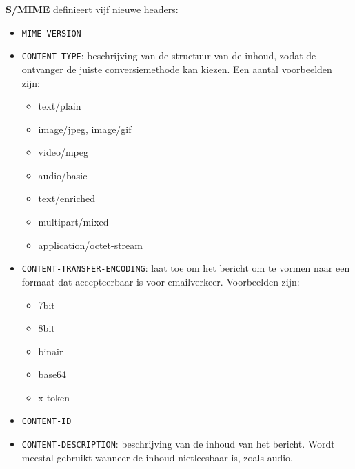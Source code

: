 \documentclass{report}
\begin{document}
	\textbf{S/MIME} definieert \underline{vijf nieuwe headers}:
	\begin{itemize}
		\item[\info] \texttt{MIME-VERSION}
		\item[\info] \texttt{CONTENT-TYPE}: beschrijving van de structuur van de inhoud, zodat de ontvanger de juiste conversiemethode kan kiezen. Een aantal voorbeelden zijn: \begin{itemize}
			\item text/plain
			\item image/jpeg, image/gif
			\item video/mpeg
			\item audio/basic
			\item text/enriched
			\item multipart/mixed
			\item application/octet-stream
		\end{itemize}
		\item[\info] \texttt{CONTENT-TRANSFER-ENCODING}: laat toe om het bericht om te vormen naar een formaat dat accepteerbaar is voor emailverkeer. Voorbeelden zijn:
		\begin{itemize}
			\item 7bit
			\item 8bit
			\item binair
			\item base64
			\item x-token
		\end{itemize}
		\item[\info] \texttt{CONTENT-ID}
		\item[\info] \texttt{CONTENT-DESCRIPTION}: beschrijving van de inhoud van het bericht. Wordt meestal gebruikt wanneer de inhoud nietleesbaar is, zoals audio.
	\end{itemize}
\end{document}
